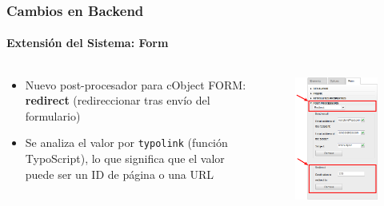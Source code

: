 \begin{frame}[fragile]
	\frametitle{Cambios en Backend}
	\framesubtitle{Extensión del Sistema: Form}

	\begin{columns}[T]

		\begin{column}{.5\textwidth}
			\begin{itemize}
				\item Nuevo post-procesador para cObject FORM: \textbf{redirect}\newline
					(redireccionar tras envío del formulario)
				\item Se analiza el valor por \texttt{typolink} (función TypoScript),\newline
					lo que significa que el valor puede ser un ID de página o una URL
			\end{itemize}
		\end{column}

		\begin{column}{.5\textwidth}
			\begin{figure}\vspace*{-0.4cm}
				\includegraphics[width=0.65\linewidth]{Images/BackendChanges/FormRedirectPostProcessor.png}
			\end{figure}
		\end{column}
	\end{columns}
\end{frame}

